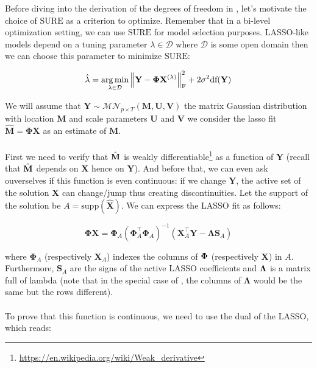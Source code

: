 \documentclass[a4paper,10pt]{article}
\theoremstyle{definition}
\begin{document}
Before diving into the derivation of the degrees of freedom in , let's motivate the choice of $\text{SURE}$ as a criterion
to optimize. Remember that in a bi-level optimization setting, we can use $\text{SURE}$ for model selection purposes. LASSO-like
models depend on a tuning parameter $\lambda \in \mathcal{D}$ where $\mathcal{D}$ is some open domain then we can choose this parameter to
minimize $\text{SURE}$:

\begin{equation*}
    \hat{\lambda} = \operatorname*{arg\,min}_{\lambda \in \mathcal{D}} \left \lVert  \mathbf{Y} - \mathbf{\Phi}\mathbf{X}^{(\lambda)} \right \rVert_{\text{F}}^2 + 2 \sigma^2 \text{df}(\bf{Y})
\end{equation*}

We will assume that $\mathbf{Y} \sim \mathcal{MN}_{p\times T}(\mathbf{M}, \mathbf{U}, \mathbf{V})$ the matrix Gaussian distribution with location $\mathbf{M}$
and scale parameters $\mathbf{U}$ and $\mathbf{V}$ we consider the lasso fit $\mathbf{\hat{M} = \Phi X}$ as an estimate of $\mathbf{M}$.
\\
\\
First we need to verify that $\hat{\bf{M}}$ is weakly differentiable\footnote{\url{https://en.wikipedia.org/wiki/Weak_derivative}} as a function of $\mathbf{Y}$
(recall that $\hat{\bf{M}}$ depends on $\mathbf{X}$ hence on $\mathbf{Y}$). And before that, we can even ask ouverselves if this function is even continuous: if
we change $\mathbf{Y}$, the active set of the solution $\mathbf{X}$ can change/jump thus creating discontinuities. Let the support of the solution be $A = \text{supp}(\hat{\mathbf{X}})$.
We can express the LASSO fit as follows:

\begin{equation*}
    \mathbf{\Phi X} = \mathbf{\Phi}_A(\mathbf{\Phi}_A^{\top}\mathbf{\Phi}_A)^{-1}(\mathbf{X}^{\top}_A\mathbf{Y} - \mathbf{\Lambda}\mathbf{S}_A)
\end{equation*}

where $\mathbf{\Phi}_A$ (respectively $\mathbf{X}_A$) indexes the columns of $\bf\Phi$ (respectively $\mathbf{X}$) in $A$. Furthermore, $\mathbf{S}_A$ are the signs of the active
LASSO coefficients and $\bf\Lambda$ is a matrix full of lambda (note that in the special case of , the columns of $\mathbf{\Lambda}$ would be the same but the rows
different).
\\
\\
To prove that this function is continuous, we need to use the dual of the LASSO, which reads:
\end{document}
